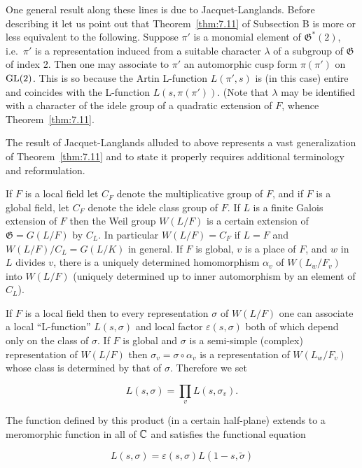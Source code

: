 One general result along these lines is due to Jacquet-Langlands. Before describing it let us point out that Theorem~\ref{thm:7.11} of Subsection B is more or less equivalent to the following. Suppose $\pi'$ is a monomial element of $\mathfrak{G}^*(2)$, i.e.\ $\pi'$ is a representation induced from a suitable character $\lambda$ of a subgroup of $\mathfrak{G}$ of index 2. Then one may associate to $\pi'$ an automorphic cusp form $\pi(\pi')$ on $\operatorname{GL}(2)$. This is so because the Artin L-function $L(\pi', s)$ is (in this case) entire and coincides with the L-function $L(s, \pi(\pi'))$. (Note that $\lambda$ may be identified with a character of the idele group of a quadratic extension of $F$, whence Theorem~\ref{thm:7.11}.

The result of Jacquet-Langlands alluded to above represents a vast generalization of Theorem~\ref{thm:7.11} and to state it properly requires additional terminology and reformulation.

If $F$ is a local field let $C_F$ denote the multiplicative group of $F$, and if $F$ is a global field, let $C_F$ denote the idele class group of $F$. If $L$ is a finite Galois extension of $F$ then the Weil group $W(L/F)$ is a certain extension of $\mathfrak{G} = G(L/F)$ by $C_L$. In particular $W(L/F) = C_F$ if $L = F$ and $W(L/F)/C_L = G(L/K)$ in general. If $F$ is global, $v$ is a place of $F$, and $w$ in $L$ divides $v$, there is a uniquely determined homomorphism $\alpha_v$ of $W(L_w/F_v)$ into $W(L/F)$ (uniquely determined up to inner automorphism by an element of $C_L$).

If $F$ is a local field then to every representation $\sigma$ of $W(L/F)$ one can associate a local ``L-function'' $L(s,\sigma)$ and local factor $\varepsilon(s,\sigma)$ both of which depend only on the class of $\sigma$. If $F$ is global and $\sigma$ is a semi-simple (complex) representation of $W(L/F)$ then $\sigma_v = \sigma \circ \alpha_v$ is a representation of $W(L_w/F_v)$ whose class is determined by that of $\sigma$. Therefore we set

\begin{equation}\label{eq:7.52}
L(s,\sigma) = \prod_v L(s,\sigma_v).\tag{7.52}
\end{equation}

The function defined by this product (in a certain half-plane) extends to a meromorphic function in all of $\mathbb{C}$ and satisfies the functional equation

\begin{equation}\label{eq:7.53}
L(s,\sigma) = \varepsilon(s,\sigma)L(1 - s,\tilde{\sigma})\tag{7.53}
\end{equation}

